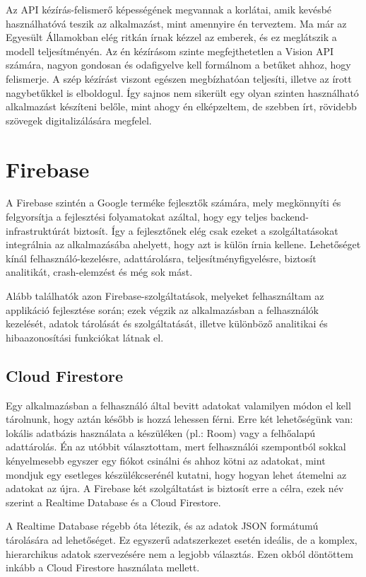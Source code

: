 Az API kézírás-felismerő képességének megvannak a korlátai, amik kevésbé használhatóvá teszik az alkalmazást, mint amennyire én terveztem. Ma már az Egyesült Államokban elég ritkán írnak kézzel az emberek, és ez meglátszik a modell teljesítményén. Az én kézírásom szinte megfejthetetlen a Vision API számára, nagyon gondosan és odafigyelve kell formálnom a betűket ahhoz, hogy felismerje. A szép kézírást viszont egészen megbízhatóan teljesíti, illetve az írott nagybetűkkel is elboldogul. Így sajnos nem sikerült egy olyan szinten használható alkalmazást készíteni belőle, mint ahogy én elképzeltem, de szebben írt, rövidebb szövegek digitalizálására megfelel.

\section{Firebase}

A Firebase szintén a Google terméke fejlesztők számára, mely megkönnyíti és felgyorsítja a fejlesztési folyamatokat azáltal, hogy egy teljes backend-infrastruktúrát biztosít. Így a fejlesztőnek elég csak ezeket a szolgáltatásokat integrálnia az alkalmazásába ahelyett, hogy azt is külön írnia kellene. Lehetőséget kínál felhasználó-kezelésre, adattárolásra, teljesítményfigyelésre, biztosít analitikát, crash-elemzést és még sok mást.

Alább találhatók azon Firebase-szolgáltatások, melyeket felhasználtam az applikáció fejlesztése során; ezek végzik az alkalmazásban a felhasználók kezelését, adatok tárolását és szolgáltatását, illetve különböző analitikai és hibaazonosítási funkciókat látnak el.

\subsection{Cloud Firestore}
Egy alkalmazásban a felhasználó által bevitt adatokat valamilyen módon el kell tárolnunk, hogy aztán később is hozzá lehessen férni. Erre két lehetőségünk van: lokális adatbázis használata a készüléken (pl.: Room) vagy a felhőalapú adattárolás. Én az utóbbit választottam, mert felhasználói szempontból sokkal kényelmesebb egyszer egy fiókot csinálni és ahhoz kötni az adatokat, mint mondjuk egy esetleges készülékcserénél kutatni, hogy hogyan lehet átemelni az adatokat az újra. A Firebase két szolgáltatást is biztosít erre a célra, ezek név szerint a Realtime Database és a Cloud Firestore.

A Realtime Database régebb óta létezik, és az adatok JSON formátumú tárolására ad lehetőséget. Ez egyszerű adatszerkezet esetén ideális, de a komplex, hierarchikus adatok szervezésére nem a legjobb választás. Ezen okból döntöttem inkább a Cloud Firestore használata mellett.

